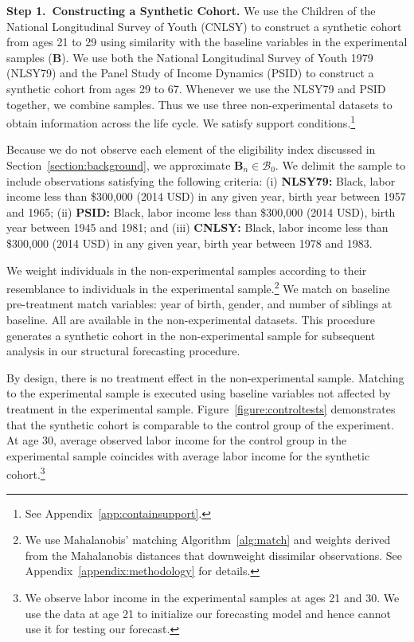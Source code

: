 \noindent \textbf{Step 1.\ Constructing a Synthetic Cohort.} We use the Children of the National Longitudinal Survey of Youth (CNLSY) to construct a synthetic cohort from ages 21 to 29 using similarity with the baseline variables in the experimental samples ($\bm{B}$). We use both the National Longitudinal Survey of Youth 1979 (NLSY79) and the Panel Study of Income Dynamics (PSID) to construct a synthetic cohort from ages 29 to 67. Whenever we use the NLSY79 and PSID together, we combine samples. Thus we use three non-experimental datasets to obtain information across the life cycle. We satisfy support conditions.\footnote{See Appendix~\ref{app:containsupport}.}

Because we do not observe each element of the eligibility index discussed in Section~\ref{section:background}, we approximate $\bm{B}_{n} \in \mathcal{B}_0$. We delimit the sample to include observations satisfying the following criteria: (i) \textbf{NLSY79:} Black, labor income less than \$300,000 (2014 USD) in any given year, birth year between 1957 and 1965; (ii) \textbf{PSID:} Black, labor income less than \$300,000 (2014 USD), birth year between 1945 and 1981; and (iii) \textbf{CNLSY:} Black, labor income less than \$300,000 (2014 USD) in any given year, birth year between 1978 and 1983.

We weight individuals in the non-experimental samples according to their resemblance to individuals in the experimental sample.\footnote{We use Mahalanobis' matching Algorithm~\ref{alg:match} and weights derived from the Mahalanobis distances that downweight dissimilar observations. See Appendix~\ref{appendix:methodology} for details.} We match on baseline pre-treatment match variables: year of birth, gender, and number of siblings at baseline. All are available in the non-experimental datasets. This procedure generates a synthetic cohort in the non-experimental sample for subsequent analysis in our structural forecasting procedure.

By design, there is no treatment effect in the non-experimental sample. Matching to the experimental sample is executed using baseline variables not affected by treatment in the experimental sample. Figure~\ref{figure:controltests} demonstrates that the synthetic cohort is comparable to the control group of the experiment. At age 30, average observed labor income for the control group in the experimental sample coincides with average labor income for the synthetic cohort.\footnote{We observe labor income in the experimental samples at ages 21 and 30. We use the data at age 21 to initialize our forecasting model and hence cannot use it for testing our forecast.}


